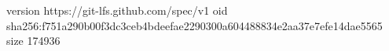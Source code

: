version https://git-lfs.github.com/spec/v1
oid sha256:f751a290b00f3dc3ceb4bdeefae2290300a604488834e2aa37e7efe14dae5565
size 174936
